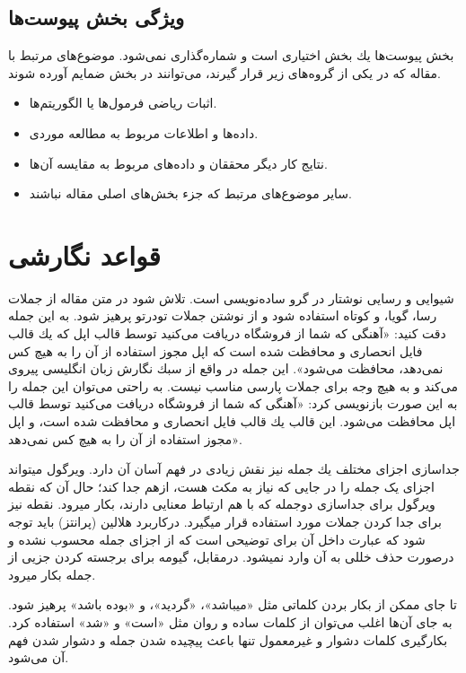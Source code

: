 \documentclass{CSICC2016}
\begin{document}
\subsection{ویژگی بخش پیوست‌ها}
بخش پیوست‌ها یك بخش اختیاری است و شماره‌گذاری  نمی‌شود. موضوع‌های مرتبط با مقاله كه در یكی از گروه‌های زیر قرار گیرند، می‌توانند در بخش ضمایم آورده شوند.
\begin{itemize}
\item
اثبات ریاضی فرمول‌ها یا الگوریتم‌ها.
\item
داده‌ها و اطلاعات مربوط به مطالعه موردی.
\item
نتایج كار دیگر محققان و داده‌های مربوط به مقایسه آن‌ها.
\item
سایر موضوع‌های مرتبط كه جزء بخش‌های اصلی مقاله نباشند.
\end{itemize}


\section{قواعد نگارشی}

شیوایی و رسایی نوشتار در گرو ساده‌نویسی است. تلاش شود در متن مقاله از جملات رسا، گویا، و كوتاه استفاده شود و از نوشتن جملات تودرتو پرهیز شود. به این جمله دقت كنید: «آهنگی كه شما از فروشگاه  دریافت می‌كنید توسط قالب  اپل كه یك قالب فایل  انحصاری و محافظت شده است كه اپل مجوز استفاده از آن را به هیچ كس نمی‌دهد، محافظت می‌شود». این جمله در واقع از سبك نگارش زبان انگلیسی پیروی می‌كند و به هیچ وجه برای جملات پارسی مناسب نیست. به راحتی می‌توان این جمله را به این صورت بازنویسی كرد: «آهنگی كه شما از فروشگاه  دریافت می‌كنید توسط قالب  اپل محافظت می‌شود. این قالب یك قالب فایل  انحصاری و محافظت شده است، و اپل مجوز استفاده از آن را به هیچ كس نمی‌دهد».

جداسازی اجزای مختلف یك جمله نیز نقش زیادی در فهم آسان آن دارد. ویرگول می­تواند اجزای یک جمله را در جایی که نیاز به مکث هست، ازهم جدا کند؛ حال آن که نقطه ویرگول برای جداسازی دوجمله که با هم ارتباط معنایی دارند، بکار می­رود. نقطه نیز برای جدا كردن جملات مورد استفاده قرار می­گیرد. درکاربرد هلالین (پرانتز) باید توجه شود که عبارت داخل آن برای توضیحی است که از اجزای جمله محسوب نشده و درصورت حذف خللی به آن وارد نمی­شود. درمقابل، گیومه برای برجسته کردن جزیی از جمله بکار می­رود.

تا جای ممكن از بكار بردن كلماتی مثل «می­باشد»، «گردید»، و «بوده باشد» پرهیز شود. به جای آن‌ها اغلب می‌توان از كلمات ساده و روان مثل «است» و «شد» استفاده كرد. بكارگیری كلمات دشوار و غیرمعمول تنها باعث پیچیده شدن جمله و دشوار شدن فهم آن می‌شود.
\end{document}
